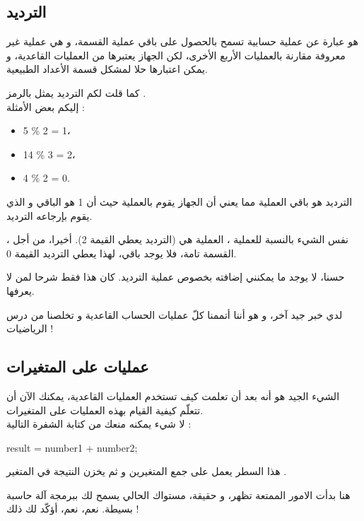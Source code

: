 \subsection{الترديد}

هو عبارة عن عملية حسابية تسمح بالحصول على باقي عملية القسمة، و هي عملية غير معروفة مقارنة بالعمليات الأربع الأخرى، لكن الجهاز يعتبرها من العمليات القاعدية، و يمكن اعتبارها حلا لمشكل قسمة الأعداد الطبيعية.

كما قلت لكم الترديد يمثل بالرمز
\InlineCode{\%}.\\
إليكم بعض الأمثلة :

\begin{itemize}
  \item 5 \% 2 = 1،
  \item 14 \% 3 = 2،
  \item 4 \% 2 = 0.
\end{itemize}

الترديد
هو باقي العملية
مما يعني أن الجهاز يقوم بالعملية
حيث أن 1 هو الباقي و الذي يقوم بإرجاعه الترديد.

نفس الشيء بالنسبة للعملية
،
العملية هي
(الترديد يعطي القيمة  2). أخيرا، من أجل
،
القسمة تامة، فلا يوجد باقي، لهذا يعطي الترديد القيمة 0.

حسنا، لا يوجد ما يمكنني إضافته بخصوص عملية الترديد. كان هذا فقط شرحا لمن لا يعرفها.

لدي خبر جيد آخر، و هو أننا أتممنا كلّ عمليات الحساب القاعدية و تخلصنا من درس الرياضيات !

\subsection{عمليات على المتغيرات}

الشيء الجيد هو أنه بعد أن تعلمت كيف تستخدم العمليات القاعدية، يمكنك الآن أن تتعلّم كيفية القيام بهذه العمليات على المتغيرات.\\
لا شيء يمكنه منعك من كتابة الشفرة التالية :

\begin{Csource}
  result = number1 + number2;
\end{Csource}

هذا السطر يعمل على جمع المتغيرين
و
ثم يخزن النتيجة في المتغير
.

هنا بدأت الامور الممتعة تظهر، و حقيقة، مستواك الحالي يسمح لك ببرمجة آلة حاسبة بسيطة. نعم، نعم، أؤكّد لك ذلك !

